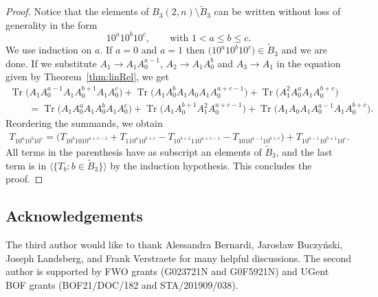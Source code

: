 \documentclass[pdftex]{sigma}
\numberwithin{equation}{section}
\DeclareMathOperator{\Tr}{Tr}
\begin{document}
\begin{proof}
Notice that the elements of $B_3(2,n)\setminus \tilde{B}_3$ can be written without loss of generality in the form
\[
10^a10^b10^c, \qquad \text{with }1< a\leq b\leq c.
\]
We use induction on $a$. If $a=0$ and $a=1$ then $\big(10^a10^b10^c\big)\in \tilde{B}_3$ and we are done.
If we substitute $A_1 \to A_1A_0^{a-1}$, $A_2 \to A_1A_0^{b}$ and $A_3 \to A_1$
in the equation given by Theorem~\ref{thm:linRel}, we get
\begin{gather*}
\Tr\big(A_1A_0^{a-1} A_1A_0^{b+1} A_1 A_0^c\big) +\Tr\big(A_1A_0^{b} A_1 A_0 A_1A_0^{a+c-1} \big)+ \Tr\big(A_1^2A_0^{a} A_1A_0^{b+c}\big)   \nonumber\\
\qquad{}=\Tr\big(A_1A_0^{a} A_1A_0^{b} A_1 A_0^c\big) + \Tr\big(A_1A_0^{b+1} A_1^2 A_0^{a+c-1} \big) + \Tr\big(A_1 A_0 A_1A_0^{a-1} A_1A_0^{b+c} \big).
\end{gather*}
Reordering the summands, we obtain
\begin{gather*}
T_{10^{a} 10^{b} 1 0^c} = \big(T_{10^{b} 1 0 10^{a+c-1} }+ T_{110^{a} 10^{b+c}} - T_{10^{b+1} 11 0^{a+c-1} } - T_{1 0 10^{a-1} 10^{b+c} }\big)+ T_{10^{a-1} 10^{b+1} 1 0^c}.
\end{gather*}
All terms in the parenthesis have as subscript an elements of $\tilde{B}_3$, and the last term is in $\big\langle\big\{T_b\colon b\in \tilde{B}_3\big\}\big\rangle$ by the induction hypothesis.
This concludes the proof.
\end{proof}

\subsection*{Acknowledgements}
The third author would like to thank Alessandra Bernardi, Jaros{\l}aw Buczy{\'n}ski, Joseph Landsberg, and Frank Verstraete for many helpful discussions. The second author is supported by FWO grants (G023721N and G0F5921N) and UGent BOF grants (BOF21/DOC/182 and STA/201909/038).
\end{document}
